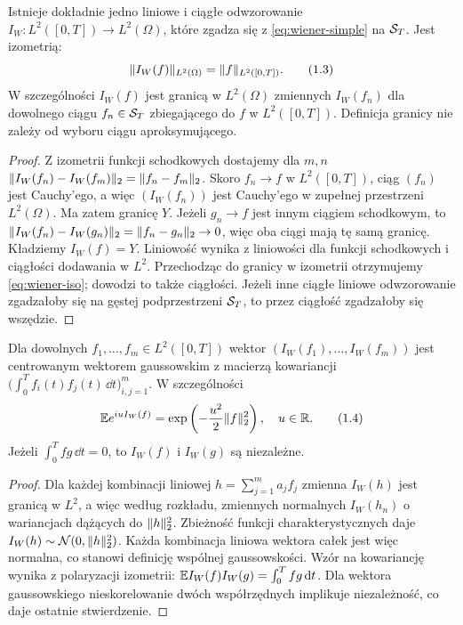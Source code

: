 \begin{twierdzenie}\label{th:wiener-extension}
Istnieje dokładnie jedno liniowe i ciągłe odwzorowanie
$I_W:L^2([0,T])\to L^2(\Omega)$, które zgadza się z
\eqref{eq:wiener-simple} na $\mathcal{S}_T$. Jest izometrią:
\[
\lVert I_W(f)\rVert_{L^2(\Omega)}=\lVert f\rVert_{L^2([0,T])}.
\tag{1.3}\label{eq:wiener-iso}
\]
W szczególności $I_W(f)$ jest granicą w $L^2(\Omega)$
zmiennych $I_W(f_n)$ dla dowolnego ciągu $f_n\in\mathcal{S}_T$
zbiegającego do $f$ w $L^2([0,T])$. Definicja granicy
nie zależy od wyboru ciągu aproksymującego.
\end{twierdzenie}
\begin{proof}
Z izometrii funkcji schodkowych dostajemy dla $m,n$
$\lVert I_W(f_n)-I_W(f_m)\rVert_2=\lVert f_n-f_m\rVert_2$.
Skoro $f_n\to f$ w $L^2([0,T])$, ciąg $(f_n)$ jest Cauchy'ego,
a więc $(I_W(f_n))$ jest Cauchy'ego w zupełnej przestrzeni
$L^2(\Omega)$. Ma zatem granicę $Y$. Jeżeli $g_n\to f$
jest innym ciągiem schodkowym, to
$\lVert I_W(f_n)-I_W(g_n)\rVert_2=\lVert f_n-g_n\rVert_2\to0$,
więc oba ciągi mają tę samą granicę. Kładziemy $I_W(f)=Y$.
Liniowość wynika z liniowości dla funkcji schodkowych i
ciągłości dodawania w $L^2$. Przechodząc do granicy w izometrii
otrzymujemy \eqref{eq:wiener-iso}; dowodzi to także ciągłości.
Jeżeli inne ciągłe liniowe odwzorowanie zgadzałoby się na gęstej
podprzestrzeni $\mathcal{S}_T$, to przez ciągłość zgadzałoby się
wszędzie.
\end{proof}

\begin{twierdzenie}\label{th:wiener-gaussian}
Dla dowolnych $f_1,\ldots,f_m\in L^2([0,T])$ wektor
$(I_W(f_1),\ldots,I_W(f_m))$ jest centrowanym wektorem gaussowskim
z macierzą kowariancji
$\big(\int_0^T f_i(t)f_j(t)\,\dd t\big)_{i,j=1}^m$.
W szczególności
\[
\mathbb{E} e^{iuI_W(f)}=\exp\left(-\frac{u^2}{2}\lVert f\rVert_2^2\right),
\quad u\in\mathbb{R}.
\tag{1.4}
\]
Jeżeli $\int_0^Tfg\,\dd t=0$, to $I_W(f)$ i $I_W(g)$
są niezależne.
\end{twierdzenie}
\begin{proof}
Dla każdej kombinacji liniowej $h=\sum_{j=1}^ma_jf_j$
zmienna $I_W(h)$ jest granicą w $L^2$, a więc według
rozkładu, zmiennych normalnych $I_W(h_n)$ o wariancjach
dążących do $\lVert h\rVert_2^2$. Zbieżność funkcji
charakterystycznych daje $I_W(h)\sim\mathcal{N}(0,\lVert h\rVert_2^2)$.
Każda kombinacja liniowa wektora całek jest więc normalna,
co stanowi definicję wspólnej gaussowskości. Wzór na kowariancję
wynika z polaryzacji izometrii:
$\mathbb{E} I_W(f)I_W(g)=\int_0^Tfg\,\mathrm{d} t$.
Dla wektora gaussowskiego nieskorelowanie dwóch współrzędnych
implikuje niezależność, co daje ostatnie stwierdzenie.
\end{proof}

